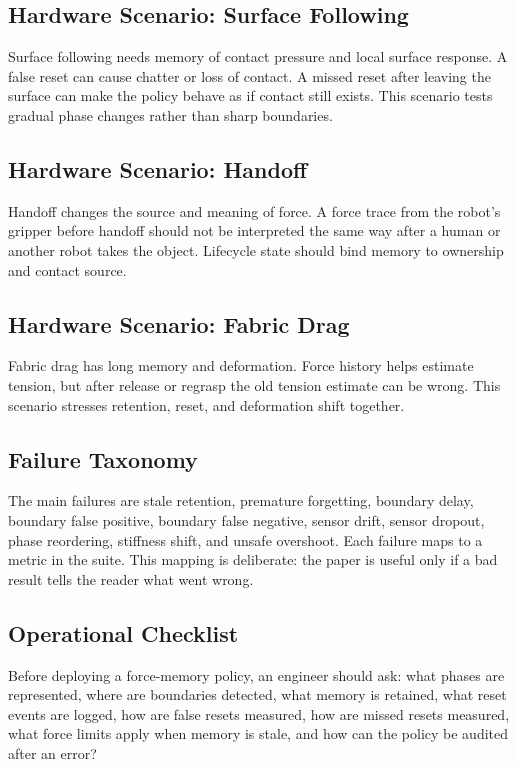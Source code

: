 \documentclass{article}
\begin{document}
\subsection{Hardware Scenario: Surface Following}

Surface following needs memory of contact pressure and local surface response.
A false reset can cause chatter or loss of contact. A missed reset after leaving
the surface can make the policy behave as if contact still exists. This
scenario tests gradual phase changes rather than sharp boundaries.

\subsection{Hardware Scenario: Handoff}

Handoff changes the source and meaning of force. A force trace from the robot's
gripper before handoff should not be interpreted the same way after a human or
another robot takes the object. Lifecycle state should bind memory to ownership
and contact source.

\subsection{Hardware Scenario: Fabric Drag}

Fabric drag has long memory and deformation. Force history helps estimate
tension, but after release or regrasp the old tension estimate can be wrong.
This scenario stresses retention, reset, and deformation shift together.

\subsection{Failure Taxonomy}

The main failures are stale retention, premature forgetting, boundary delay,
boundary false positive, boundary false negative, sensor drift, sensor dropout,
phase reordering, stiffness shift, and unsafe overshoot. Each failure maps to a
metric in the suite. This mapping is deliberate: the paper is useful only if a
bad result tells the reader what went wrong.

\subsection{Operational Checklist}

Before deploying a force-memory policy, an engineer should ask: what phases are
represented, where are boundaries detected, what memory is retained, what reset
events are logged, how are false resets measured, how are missed resets
measured, what force limits apply when memory is stale, and how can the policy
be audited after an error?
\end{document}
